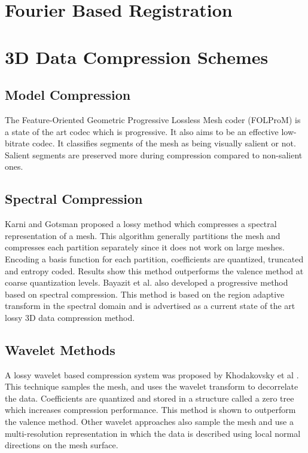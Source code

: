 \section{Fourier Based Registration}

\section{3D Data Compression Schemes}

\subsection{Model Compression}

The Feature-Oriented Geometric Progressive Lossless Mesh coder (FOLProM) \cite{Peng10Feature} is a state of the art codec which is progressive. It also aims to be an effective low-bitrate codec. It classifies segments of the mesh as being visually salient or not. Salient segments are preserved more during compression compared to non-salient ones. \\

\subsection{Spectral Compression}

Karni and Gotsman \cite{Karni00Spectral} proposed a lossy method which compresses a spectral representation of a mesh. This algorithm generally partitions the mesh and compresses each partition separately since it does not work on large meshes. Encoding a basis function for each partition, coefficients are quantized, truncated and entropy coded. Results show this method outperforms the valence method \cite{touma98triangle} at coarse quantization levels. Bayazit et al. \cite{Bayazit103DMesh} also developed a progressive method based on spectral compression. This method is based on the region adaptive transform in the spectral domain and is advertised as a current state of the art lossy 3D data compression method. \\

\subsection{Wavelet Methods}

A lossy wavelet based compression system was proposed by Khodakovsky et al \cite{Khodakovsky00Progressive}. This technique samples the mesh, and uses the wavelet transform to decorrelate the data. Coefficients are quantized and stored in a structure called a zero tree which increases compression performance. This method is shown to outperform the valence method. Other wavelet approaches \cite{Guskov00Normal,Khodakovsky04Normalmesh} also sample the mesh and use a multi-resolution representation in which the data is described using local normal directions on the mesh surface.

